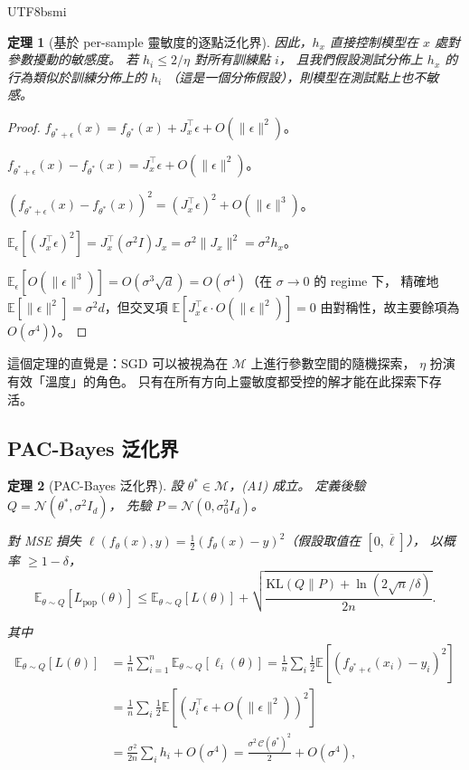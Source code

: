 \documentclass[11pt,a4paper]{article}
\newtheorem{theorem}{定理}
\theoremstyle{definition}
\newcommand{\E}{\mathbb{E}}
\newcommand{\cM}{\mathcal{M}}
\newcommand{\cC}{\mathcal{C}}
\begin{document}
\begin{CJK}{UTF8}{bsmi}
\begin{theorem}[基於 per-sample 靈敏度的逐點泛化界]
  因此，$h_x$ 直接控制模型在 $x$ 處對參數擾動的敏感度。
  若 $h_i\leq 2/\eta$ 對所有訓練點 $i$，
  且我們假設測試分佈上 $h_x$ 的行為類似於訓練分佈上的 $h_i$
  （這是一個分佈假設），則模型在測試點上也不敏感。
\end{theorem}

\begin{proof}
  $f_{\theta^*+\epsilon}(x) = f_{\theta^*}(x) + J_x^\top\epsilon + O(\|\epsilon\|^2)$。

  $f_{\theta^*+\epsilon}(x) - f_{\theta^*}(x) = J_x^\top\epsilon + O(\|\epsilon\|^2)$。

  $(f_{\theta^*+\epsilon}(x) - f_{\theta^*}(x))^2 = (J_x^\top\epsilon)^2 + O(\|\epsilon\|^3)$。

  $\E_\epsilon[(J_x^\top\epsilon)^2] = J_x^\top(\sigma^2 I)J_x = \sigma^2\|J_x\|^2 = \sigma^2 h_x$。

  $\E_\epsilon[O(\|\epsilon\|^3)] = O(\sigma^3\sqrt{d}) = O(\sigma^4)$（在 $\sigma\to 0$ 的 regime 下，
  精確地 $\E[\|\epsilon\|^2]=\sigma^2 d$，但交叉項 $\E[J_x^\top\epsilon\cdot O(\|\epsilon\|^2)]=0$
  由對稱性，故主要餘項為 $O(\sigma^4)$）。
\end{proof}

這個定理的直覺是：SGD 可以被視為在 $\cM$ 上進行參數空間的隨機探索，
$\eta$ 扮演有效「溫度」的角色。
只有在所有方向上靈敏度都受控的解才能在此探索下存活。

\subsection{PAC-Bayes 泛化界}

\begin{theorem}[PAC-Bayes 泛化界]\label{thm:pac-bayes}
  設 $\theta^*\in\cM$，(A1) 成立。
  定義後驗 $Q=\mathcal{N}(\theta^*,\sigma^2 I_d)$，
  先驗 $P=\mathcal{N}(0,\sigma_0^2 I_d)$。

  對 MSE 損失 $\ell(f_\theta(x),y)=\frac{1}{2}(f_\theta(x)-y)^2$（假設取值在 $[0,\overline{\ell}]$），
  以概率 $\geq 1-\delta$，
  \begin{equation}\label{eq:pac-bayes}
    \E_{\theta\sim Q}[L_{\mathrm{pop}}(\theta)]
    \leq \E_{\theta\sim Q}[L(\theta)]
    + \sqrt{\frac{\mathrm{KL}(Q\|P)+\ln(2\sqrt{n}/\delta)}{2n}}.
  \end{equation}

  其中
  \begin{align}
    \E_{\theta\sim Q}[L(\theta)]
    &= \frac{1}{n}\sum_{i=1}^n\E_{\theta\sim Q}[\ell_i(\theta)]
    = \frac{1}{n}\sum_i\frac{1}{2}\E[(f_{\theta^*+\epsilon}(x_i)-y_i)^2]\nonumber\\
    &= \frac{1}{n}\sum_i\frac{1}{2}\E[(J_i^\top\epsilon+O(\|\epsilon\|^2))^2]\nonumber\\
    &= \frac{\sigma^2}{2n}\sum_i h_i + O(\sigma^4)
    = \frac{\sigma^2\,\cC(\theta^*)^2}{2} + O(\sigma^4),\label{eq:expected-train}
  \end{align}


\end{theorem}
\end{CJK}
\end{document}
